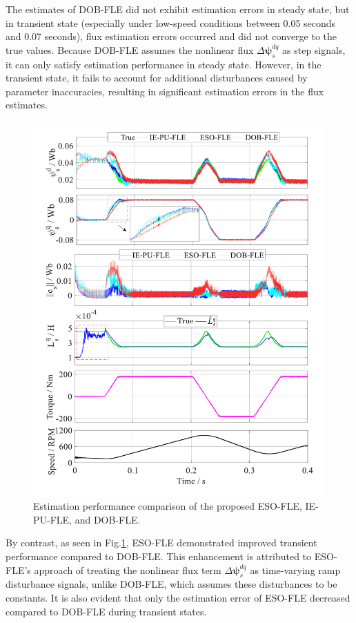 The estimates of DOB-FLE did not exhibit estimation errors in steady state, but in transient state (especially under low-speed conditions between 0.05 seconds and 0.07 seconds), flux estimation errors occurred and did not converge to the true values. Because DOB-FLE assumes the nonlinear flux $\Delta\boldsymbol{\psi}^{dq}_s$ as step signals, it can only satisfy estimation performance in steady state. However, in the transient state, it fails to account for additional disturbances caused by parameter inaccuracies, resulting in significant estimation errors in the flux estimates. \begin{figure}[!t]
    \centering
    \includegraphics[scale=0.58]{chapters/Fig4.8.pdf}
    \caption{Estimation performance comparison of the proposed ESO-FLE, IE-PU-FLE, and DOB-FLE. }
    \label{Fig:4.8}
\end{figure} 

By contrast, as seen in Fig.\ref{Fig:4.8}, ESO-FLE demonstrated improved transient performance compared to DOB-FLE. This enhancement is attributed to ESO-FLE's approach of treating the nonlinear flux term $\Delta\boldsymbol{\psi}^{dq}_s$ as time-varying ramp disturbance signals, unlike DOB-FLE, which assumes these disturbances to be constants. It is also evident that only the estimation error of ESO-FLE decreased compared to DOB-FLE during transient states.

